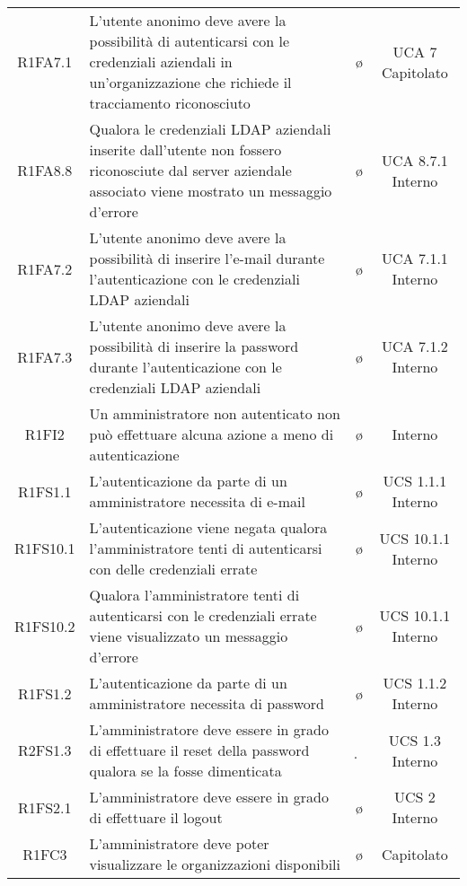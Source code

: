 {\begin{longtable}{ c C{8cm} c c}

R1FA7.1 & L'utente anonimo deve avere la possibilità di autenticarsi con le credenziali aziendali in un'organizzazione che richiede il tracciamento riconosciuto & \o & UCA 7 Capitolato \\

R1FA8.8 & Qualora le credenziali LDAP aziendali inserite dall'utente non fossero riconosciute dal server aziendale associato viene mostrato un messaggio d'errore & \o & UCA 8.7.1 Interno \\

R1FA7.2 & L'utente anonimo deve avere la possibilità di inserire l'e-mail durante l'autenticazione con le credenziali LDAP aziendali & \o & UCA 7.1.1 Interno \\

R1FA7.3 & L'utente anonimo deve avere la possibilità di inserire la password durante l'autenticazione con le credenziali LDAP aziendali & \o & UCA 7.1.2 Interno \\

R1FI2 & Un amministratore non autenticato non può effettuare alcuna azione a meno di autenticazione & \o & Interno \\

R1FS1.1 & L’autenticazione da parte di un amministratore necessita di e-mail & \o & UCS 1.1.1 Interno\\

R1FS10.1 & L’autenticazione viene negata qualora l'amministratore tenti di autenticarsi con delle credenziali errate & \o & UCS 10.1.1 Interno \\

R1FS10.2 & Qualora l'amministratore tenti di autenticarsi con le credenziali errate viene visualizzato un messaggio d’errore & \o & UCS 10.1.1 Interno \\

R1FS1.2 & L’autenticazione da parte di un amministratore necessita di password & \o & UCS 1.1.2 Interno\\

R2FS1.3 & L'amministratore deve essere in grado di effettuare il reset della password qualora se la fosse dimenticata & \d & UCS 1.3 Interno\\

R1FS2.1 & L'amministratore deve essere in grado di effettuare il logout & \o & UCS 2 Interno\\

R1FC3 & L'amministratore deve poter visualizzare le organizzazioni disponibili & \o & Capitolato\\


\end{longtable}}
